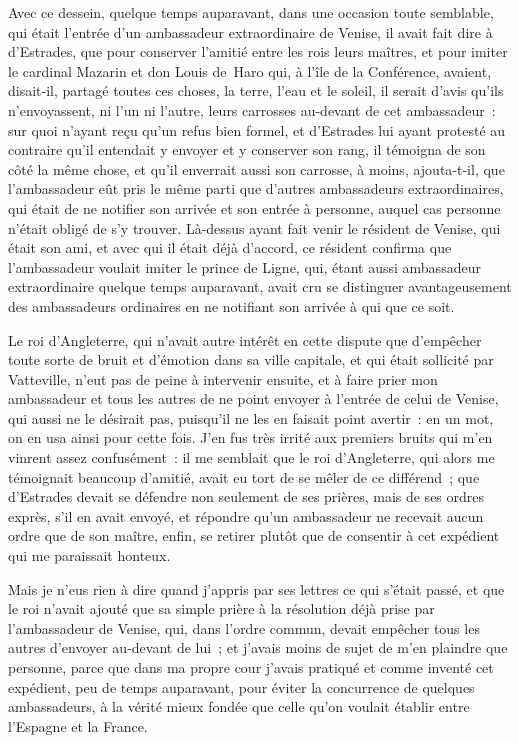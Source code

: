 \documentclass[french,twoside]{book} %
\begin{document}
Avec ce dessein, quelque temps auparavant, dans une occasion toute semblable, qui était l’entrée d’un ambassadeur extraordinaire de Venise, il avait fait dire à d’Estrades, que pour conserver l’amitié entre les rois leurs maîtres, et pour imiter le cardinal Mazarin et don Louis de Haro qui, à l’île de la Conférence, avaient, disait-il, partagé toutes ces choses, la terre, l’eau et le soleil, il serait d’avis qu’ils n’envoyassent, ni l’un ni l’autre, leurs carrosses au-devant de cet ambassadeur : sur quoi n’ayant reçu qu’un refus bien formel, et d’Estrades lui ayant protesté au contraire qu’il entendait y envoyer et y conserver son rang, il témoigna de son côté la même chose, et qu’il enverrait aussi son carrosse, à moins, ajouta-t-il, que l’ambassadeur eût pris le même parti que d’autres ambassadeurs extraordinaires, qui était de ne notifier son arrivée et son entrée à personne, auquel cas personne n’était obligé de s’y trouver. Là-dessus ayant fait venir le résident de Venise, qui était son ami, et avec qui il était déjà d’accord, ce résident confirma que l’ambassadeur voulait imiter le prince de Ligne, qui, étant aussi ambassadeur extraordinaire quelque temps auparavant, avait cru se distinguer avantageusement des ambassadeurs ordinaires en ne notifiant son arrivée à qui que ce soit.\par
Le roi d’Angleterre, qui n’avait autre intérêt en cette dispute que d’empêcher toute sorte de bruit et d’émotion dans sa ville capitale, et qui était sollicité par Vatteville, n’eut pas de peine à intervenir ensuite, et à faire prier mon ambassadeur et tous les autres de ne point envoyer à l’entrée de celui de Venise, qui aussi ne le désirait pas, puisqu’il ne les en faisait point avertir : en un mot, on en usa ainsi pour cette fois. J’en fus très irrité aux premiers bruits qui m’en vinrent assez confusément : il me semblait que le roi d’Angleterre, qui alors me témoignait beaucoup d’amitié, avait eu tort de se mêler de ce différend ; que d’Estrades devait se défendre non seulement de ses prières, mais de ses ordres exprès, s’il en avait envoyé, et répondre qu’un ambassadeur ne recevait aucun ordre que de son maître, enfin, se retirer plutôt que de consentir à cet expédient qui me paraissait honteux.\par
Mais je n’eus rien à dire quand j’appris par ses lettres ce qui s’était passé, et que le roi n’avait ajouté que sa simple prière à la résolution déjà prise par l’ambassadeur de Venise, qui, dans l’ordre commun, devait empêcher tous les autres d’envoyer au-devant de lui ; et j’avais moins de sujet de m’en plaindre que personne, parce que dans ma propre cour j’avais pratiqué et comme inventé cet expédient, peu de temps auparavant, pour éviter la concurrence de quelques ambassadeurs, à la vérité mieux fondée que celle qu’on voulait établir entre l’Espagne et la France.\par
\end{document}
